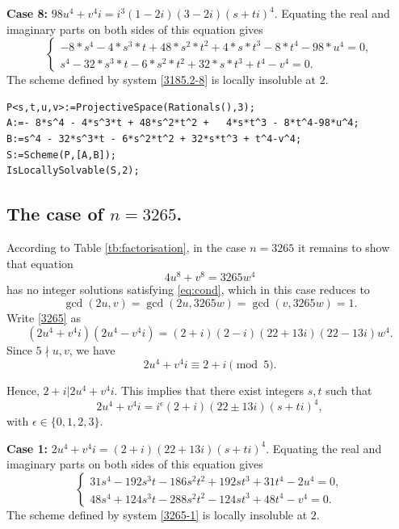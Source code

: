 \documentclass[a4paper,12pt,english,reqno]{amsart}
\begin{document}
{\bf Case 8:} $98u^4+v^4i=i^3(1-2i)(3-2i)(s+ti)^4$.  Equating the real and imaginary parts on both sides of this equation gives
\begin{equation}\label{3185.2-8}
\begin{cases}
-8*s^4 - 4*s^3*t + 48*s^2*t^2 + 4*s*t^3 - 8*t^4 - 98*u^4=0,\\
s^4 - 32*s^3*t - 6*s^2*t^2 + 32*s*t^3 + t^4 - v^4=0.
\end{cases}
\end{equation}
The scheme defined by system \eqref{3185.2-8} is locally insoluble at $2$.

\begin{lstlisting}
P<s,t,u,v>:=ProjectiveSpace(Rationals(),3);
A:=- 8*s^4 - 4*s^3*t + 48*s^2*t^2 +   4*s*t^3 - 8*t^4-98*u^4;
B:=s^4 - 32*s^3*t - 6*s^2*t^2 + 32*s*t^3 + t^4-v^4;
S:=Scheme(P,[A,B]);
IsLocallySolvable(S,2);
\end{lstlisting}


\subsection{The case of $n=3265$.}%
According to Table \ref{tb:factorisation}, in the case $n=3265$ it remains to
show that equation 
\begin{equation}\label{3265}
4 u^8 + v^8=3265  w^4
\end{equation}
has no integer solutions satisfying \eqref{eq:cond}, which in this case reduces to \[\gcd(2u,v)=\gcd(2u,3265w)=\gcd(v,3265w)=1.\]
Write \eqref{3265} as
\begin{equation} (2u^4+v^4i)(2u^4-v^4i)=(2+i)(2-i)(22+13i)(22-13i)w^4.
\end{equation}
Since $5\nmid u,v$, we have 
\[2u^4+v^4i\equiv 2+i\pmod{5}.\]

Hence, $2+i|2u^4+v^4i$. This implies that there exist integers $s,t$ such that 
\[2u^4+v^4i=i^{\epsilon}(2+i)(22\pm 13i)(s+ti)^4,\]
with $\epsilon \in \{0,1,2,3\}$.

{\bf Case 1:} $2u^4+v^4i=(2+i)(22+13i)(s+ti)^4$. Equating the real and imaginary parts on both sides of this equation gives
\begin{equation}\label{3265-1}
\begin{cases}
31s^4 - 192s^3t - 186s^2t^2 + 192st^3 + 31t^4 - 2u^4=0,\\
48s^4 + 124s^3t - 288s^2t^2 - 124st^3 + 48t^4 - v^4=0.
\end{cases}
\end{equation}
The scheme defined by system \eqref{3265-1} is locally insoluble at $2$.
\end{document}
